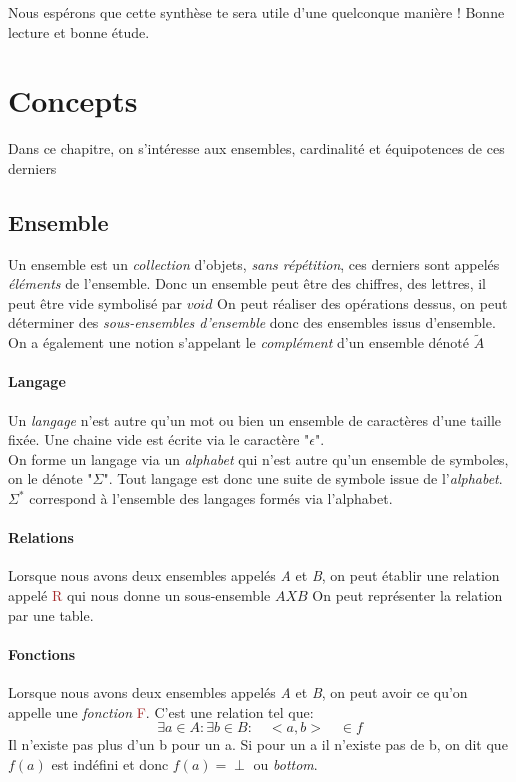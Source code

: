 \documentclass{report}
\begin{document}
Nous espérons que cette synthèse te sera utile d'une quelconque manière ! Bonne lecture et bonne étude.

\chapter{Concepts}
Dans ce chapitre, on s'intéresse aux ensembles, cardinalité et équipotences de ces derniers
\section{Ensemble}
Un ensemble est un \textit{collection} d'objets, \textit{sans répétition}, ces derniers sont appelés \textit{éléments} de l'ensemble.
Donc un ensemble peut être des chiffres, des lettres, il peut être vide symbolisé par $void$ %
On peut réaliser des opérations dessus, on peut déterminer des \textit{sous-ensembles d'ensemble} donc des ensembles issus d'ensemble.
On a également une notion s'appelant le \textit{complément} d'un ensemble dénoté $\tilde{A}$\\%

\subsubsection{Langage}
Un \textit{langage} n'est autre qu'un mot ou bien un ensemble de caractères d'une taille fixée. Une chaine vide est écrite via le caractère "$\epsilon$".\\
On forme un langage via un \textit{alphabet} qui n'est autre qu'un ensemble de symboles, on le dénote "$\Sigma$". Tout langage est donc une suite de symbole issue de l'\textit{alphabet}.\\
$\Sigma^*$ correspond à l'ensemble des langages formés via l'alphabet.

\subsubsection{Relations}
Lorsque nous avons deux ensembles appelés \textit{A} et \textit{B}, on peut établir une relation appelé \textcolor{brown}{R} qui nous donne un sous-ensemble $AXB$ %
On peut représenter la relation par une table.

\subsubsection{Fonctions}
Lorsque nous avons deux ensembles appelés \textit{A} et \textit{B}, on peut avoir ce qu'on appelle une \textit{fonction} \textcolor{brown}{F}. C'est une relation tel que:
\begin{equation}
\exists a \in A : \exists b \in B :\quad <a,b> \quad \in f
\end{equation}
Il n'existe pas plus d'un b pour un a. Si pour un a il n'existe pas de b, on dit que $f(a)$ est indéfini et donc $f(a) = \perp$ ou \textit{bottom}.
\end{document}
